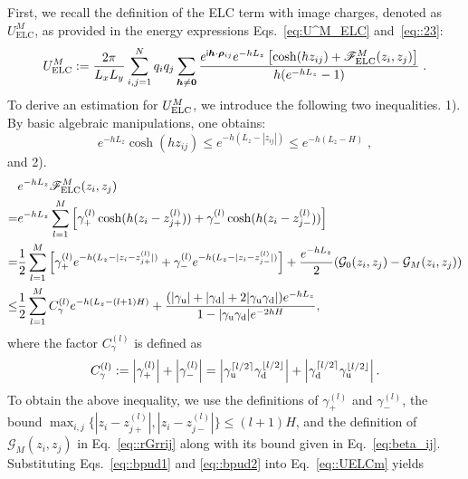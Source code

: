First, we recall the definition of the ELC term with image charges, denoted as $U_{\text{ELC}}^{M}$, as provided in the energy expressions Eqs.~\eqref{eq:U^M_ELC} and~\eqref{eq::23}:
\begin{equation}\label{eq::UELCm}
U_{\text{ELC}}^{M}:=\frac{2\pi}{L_xL_y}\sum_{i,j=1}^{N}q_iq_j\sum_{\bm{h}\neq \bm{0}} \frac{e^{\mathsf i \bm{h}\cdot\bm{\rho}_{ij}}e^{-hL_z}\left[\cosh(hz_{ij})+\mathscr{F}_{\text{ELC}}^{M}(z_i,z_j)\right]}{h(e^{-hL_z}-1)}\;.
\end{equation}
To derive an estimation for $U_{\text{ELC}}^{M}$, we introduce the following two inequalities. 
1). By basic algebraic manipulations, one obtains:  
\begin{equation}\label{eq::bpud1}
e^{-hL_z}\cosh(hz_{ij})\leq e^{-h(L_z-|z_{ij}|)}\leq e^{-h(L_z-H)}\;,
\end{equation}
and 2).
\begin{equation}\label{eq::bpud2}
\begin{split}
& e^{-hL_z}\mathscr{F}_{\text{ELC}}^{M}(z_i,z_j) \\
= & e^{-hL_z}\sum\limits_{l=1}^{M}\left[\gamma_{+}^{(l)}\cosh(h(z_i-z_{j+}^{(l)}))+\gamma_{-}^{(l)}\cosh(h(z_i-z_{j-}^{(l)}))\right]\\
= & \frac{1}{2}\sum\limits_{l=1}^{M}\left[\gamma_{+}^{(l)}e^{-h(L_z-|z_i-z_{j+}^{(l)}|)}+\gamma_{-}^{(l)}e^{-h(L_z-|z_i-z_{j-}^{(l)}|)}\right]+\frac{e^{-hL_z}}{2}(\mathcal{G}_{0}(z_i,z_j)-\mathcal{G}_{M}(z_i,z_j))\\
\leq & \frac{1}{2}\sum_{l=1}^{M}C^{(l)}_{\gamma}e^{-h(L_z-(l+1)H)}+\frac{(|\gamma_{\text{u}}|+|\gamma_{\text{d}}| + 2|\gamma_{\text{u}}\gamma_{\text{d}}|)e^{-hL_z}}{1-|\gamma_{\text{u}}\gamma_{\text{d}}|e^{-2hH}},
\end{split}
\end{equation}
where the factor $C^{(l)}_{\gamma}$ is defined as 
\begin{equation}
C^{(l)}_{\gamma}:=\left|\gamma_{+}^{(l)}\right|+\left|\gamma_{-}^{(l)}\right|=\left| \gamma_{\text{u}}^{\lceil l/2 \rceil} \gamma_{\text{d}}^{\lfloor l/2 \rfloor}\right|+\left| \gamma_{\text{d}}^{\lceil l/2 \rceil} \gamma_{\text{u}}^{\lfloor l/2 \rfloor}\right|.
\end{equation}
To obtain the above inequality, we use the definitions of $\gamma_{+}^{(l)}$ and $\gamma_{-}^{(l)}$, the bound $\max_{i,j}\{|z_i-z_{j+}^{(l)}|,|z_i-z_{j-}^{(l)}|\}\leq (l+1)H$, and the definition of $\mathcal{G}_{M}(z_i,z_j)$ in Eq.~\eqref{eq::rGrrij} along with its bound given in Eq.~\eqref{eq:beta_ij}. 
Substituting Eqs.~\eqref{eq::bpud1} and \eqref{eq::bpud2} into Eq.~\eqref{eq::UELCm} yields

